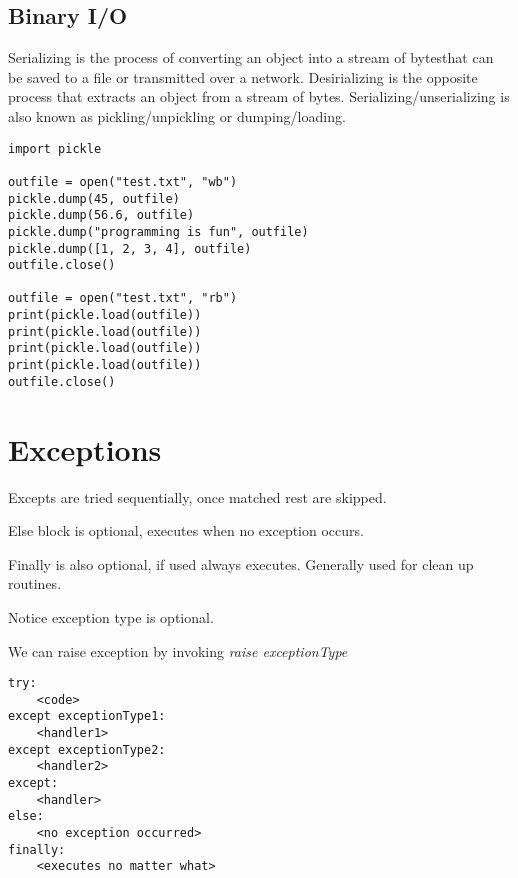 \documentclass[a4paper, 12pt]{article}
\begin{document}
\subsection{Binary I/O}
Serializing is the process of converting an object into a stream of bytesthat can be saved to a file or transmitted over a network. Desirializing is the opposite process that extracts an object from a stream of bytes. Serializing/unserializing is also known as pickling/unpickling or dumping/loading.
\begin{verbatim}
import pickle

outfile = open("test.txt", "wb")
pickle.dump(45, outfile)
pickle.dump(56.6, outfile)
pickle.dump("programming is fun", outfile)
pickle.dump([1, 2, 3, 4], outfile)
outfile.close()

outfile = open("test.txt", "rb")
print(pickle.load(outfile))
print(pickle.load(outfile))
print(pickle.load(outfile))
print(pickle.load(outfile))
outfile.close()
\end{verbatim}

\section{Exceptions}
Excepts are tried sequentially, once matched rest are skipped.

Else block is optional, executes when no exception occurs.

Finally is also optional, if used always executes. Generally used for clean up routines.

Notice exception type is optional.

We can raise exception by invoking \emph{raise exceptionType}
\begin{verbatim}
try:
    <code>
except exceptionType1:
    <handler1>
except exceptionType2:
    <handler2>
except:
    <handler>
else:
    <no exception occurred>
finally:
    <executes no matter what>
\end{verbatim}
\end{document}
